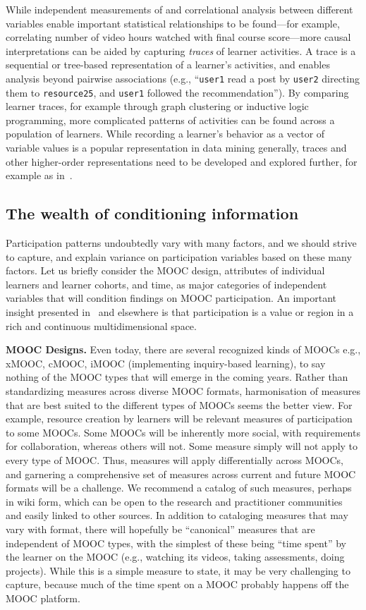 While independent measurements of and correlational analysis between
different variables 
enable important statistical relationships to be found---for example,
correlating number of video hours watched with final course score---more causal
interpretations can be aided by capturing \emph{traces} of learner
activities. A trace is a sequential or tree-based representation of a
learner's activities, and enables analysis beyond pairwise associations
(e.g., ``\texttt{user1} read a post by \texttt{user2} directing them to
\texttt{resource25},  and
\texttt{user1} followed the recommendation''). By comparing learner traces, for
example through graph clustering or inductive logic programming, more
complicated patterns of activities can be found across a population of
learners. While recording a learner's behavior as a vector of variable
values is a popular representation in data mining generally, traces and
other higher-order representations need to be developed and explored
further, for example as in~\cite{activity-tracing}.  

\subsection{The wealth of conditioning information}

Participation patterns
undoubtedly vary with many factors, and we should strive to capture, and
explain variance on participation variables based on these many
factors. Let us briefly consider the MOOC design, attributes
of individual learners and learner cohorts, and time, as major
categories of independent variables that will condition findings on MOOC
participation. An important insight presented in~\cite{mroe-2013-report}
and elsewhere is that participation is
a value or region in a rich and continuous multidimensional space.

\textbf{MOOC Designs.} Even today, there are several recognized kinds of MOOCs
e.g., xMOOC, cMOOC, iMOOC (implementing inquiry-based learning), to say nothing of the MOOC types that
will emerge in the coming years.  Rather than standardizing measures
across diverse MOOC formats, harmonisation of measures that are best
suited to the different types of MOOCs seems the better view. For
example, resource creation by learners will be relevant measures of
participation to some MOOCs. Some MOOCs will be inherently more social,
with requirements for collaboration, whereas others will not. Some
measure simply will not apply to every type of MOOC. Thus, measures will
apply differentially across MOOCs, and garnering a comprehensive set of
measures across current and future MOOC formats will be a challenge. We
recommend a catalog of such measures, perhaps in wiki form, which can be
open to the research and practitioner communities and easily linked to
other sources.  In addition to cataloging measures that may vary with
format, there will hopefully be ``canonical'' measures that are
independent of MOOC types, with the simplest of these being ``time spent''
by the learner on the MOOC (e.g., watching its videos, taking
assessments, doing projects). While this is a simple measure to state,
it may be very challenging to capture, because much of the time spent on
a MOOC probably happens off the MOOC platform.  

